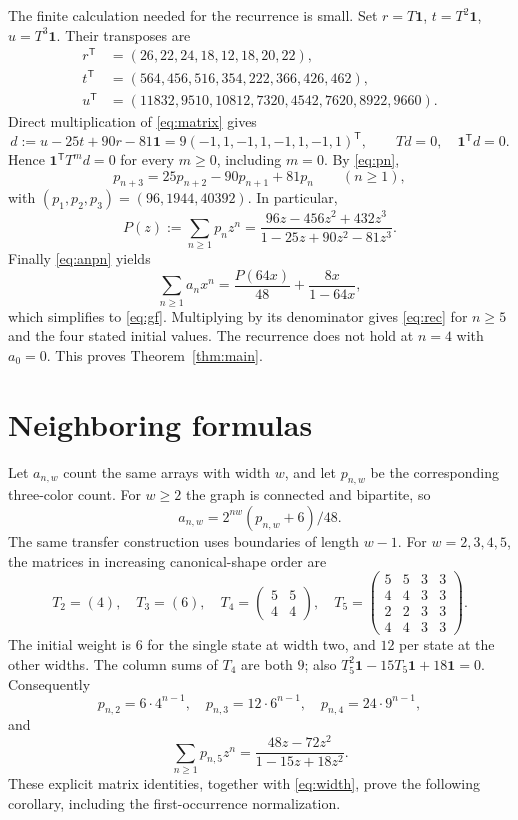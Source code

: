 \documentclass[11pt]{article}
\newcommand{\one}{\mathbf{1}}
\begin{document}
The finite calculation needed for the recurrence is small. Set
$r=T\one$, $t=T^2\one$, $u=T^3\one$. Their transposes are
\begin{align*}
r^{\mathsf T}&=(26,22,24,18,12,18,20,22),\\
t^{\mathsf T}&=(564,456,516,354,222,366,426,462),\\
u^{\mathsf T}&=(11832,9510,10812,7320,4542,7620,8922,9660).
\end{align*}
Direct multiplication of \eqref{eq:matrix} gives
\[
d:=u-25t+90r-81\one=9(-1,1,-1,1,-1,1,-1,1)^{\mathsf T},
\qquad Td=0,\quad\one^{\mathsf T}d=0.
\]
Hence $\one^{\mathsf T}T^m d=0$ for every $m\ge0$, including $m=0$.
By \eqref{eq:pn},
\[
p_{n+3}=25p_{n+2}-90p_{n+1}+81p_n\qquad(n\ge1),
\]
with $(p_1,p_2,p_3)=(96,1944,40392)$. In particular,
\begin{equation}\label{eq:pgf}
P(z):=\sum_{n\ge1}p_nz^n=
\frac{96z-456z^2+432z^3}{1-25z+90z^2-81z^3}.
\end{equation}
Finally \eqref{eq:anpn} yields
\[
\sum_{n\ge1}a_nx^n=\frac{P(64x)}{48}
+\frac{8x}{1-64x},
\]
which simplifies to \eqref{eq:gf}. Multiplying by its denominator gives
\eqref{eq:rec} for $n\ge5$ and the four stated initial values.
The recurrence does not hold at $n=4$ with $a_0=0$.
This proves Theorem~\ref{thm:main}.

\section{Neighboring formulas}
Let $a_{n,w}$ count the same arrays with width $w$, and let $p_{n,w}$
be the corresponding three-color count. For $w\ge2$ the graph is connected
and bipartite, so
\begin{equation}\label{eq:width}
a_{n,w}=2^{nw}(p_{n,w}+6)/48.
\end{equation}
The same transfer construction uses boundaries of length $w-1$.
For $w=2,3,4,5$, the matrices in increasing canonical-shape order are
\[
T_2=(4),\quad T_3=(6),\quad
T_4=\begin{pmatrix}5&5\\4&4\end{pmatrix},\quad
T_5=\begin{pmatrix}5&5&3&3\\4&4&3&3\\2&2&3&3\\4&4&3&3\end{pmatrix}.
\]
The initial weight is $6$ for the single state at width two, and $12$
per state at the other widths. The column sums of $T_4$ are both $9$;
also $T_5^2\one-15T_5\one+18\one=0$.
Consequently
\[
p_{n,2}=6\cdot4^{n-1},\quad
p_{n,3}=12\cdot6^{n-1},\quad
p_{n,4}=24\cdot9^{n-1},
\]
and
\[
\sum_{n\ge1}p_{n,5}z^n=\frac{48z-72z^2}{1-15z+18z^2}.
\]
These explicit matrix identities, together with \eqref{eq:width}, prove
the following corollary, including the first-occurrence normalization.
\end{document}
